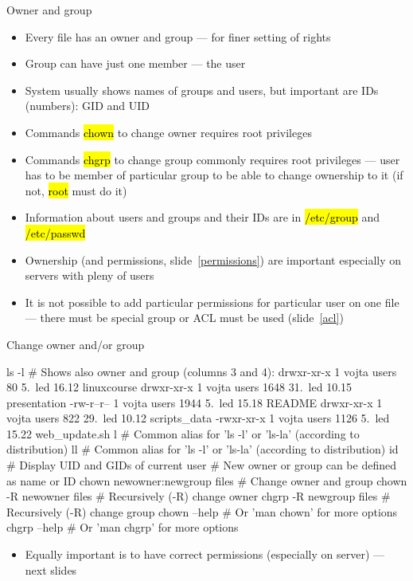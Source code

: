 \documentclass[compress, ucs, xelatex, 11pt, xcolor=svgnames,
  hyperref={
    bookmarks=true,
    unicode=true,
    colorlinks=true,
    pdftitle={Linux, command line and MetaCentrum},
    plainpages=false,
    pdfauthor={Vojtech Zeisek},
    pdfsubject={Course about use of Linux command line, writing shell scripts and using MetaCentrum of CESNET},
    pdfcreator={XeLaTeX},
    pdfkeywords={Linux, GNU, BASH, shell, command line, MetaCentrum},
    linkcolor=DarkRed,
    anchorcolor=DarkBlue,
    citecolor=Indigo,
    filecolor=NavyBlue,
    menucolor=DarkMagenta,
    urlcolor=DarkBlue,
    pdftex},
  url={hyphens, lowtilde} %
  ]{beamer}
\renewcommand{\texttt}[1]{\hl{\ttfamily #1}}
\begin{document}
\begin{frame}[fragile]{Owner and group}
  \begin{itemize}
    \item Every file has an owner and group --- for finer setting of rights
    \item Group can have just one member --- the user
    \item System usually shows names of groups and users, but important are IDs (numbers): GID and UID
    \item Commands \texttt{chown} to change owner requires root privileges
    \item Commands \texttt{chgrp} to change group commonly requires root privileges --- user has to be member of particular group to be able to change ownership to it (if not, \texttt{root} must do it)
    \item Information about users and groups and their IDs are in \texttt{/etc/group} and \texttt{/etc/passwd}
    \item Ownership (and permissions, slide~\ref{permissions}) are important especially on servers with pleny of users
    \item It is not possible to add particular permissions for particular user on one file --- there must be special group or ACL must be used (slide~\ref{acl})
  \end{itemize}
\end{frame}

\begin{frame}[fragile]{Change owner and/or group}
  \begin{bashcode}
    ls -l # Shows also owner and group (columns 3 and 4):
    drwxr-xr-x 1 vojta users    80  5. led 16.12 linuxcourse
    drwxr-xr-x 1 vojta users  1648 31. led 10.15 presentation
    -rw-r--r-- 1 vojta users  1944  5. led 15.18 README
    drwxr-xr-x 1 vojta users   822 29. led 10.12 scripts_data
    -rwxr-xr-x 1 vojta users  1126  5. led 15.22 web_update.sh
    l # Common alias for 'ls -l' or 'ls-la' (according to distribution)
    ll # Common alias for 'ls -l' or 'ls-la' (according to distribution)
    id # Display UID and GIDs of current user
    # New owner or group can be defined as name or ID
    chown newowner:newgroup files # Change owner and group
    chown -R newowner files # Recursively (-R) change owner
    chgrp -R newgroup files # Recursively (-R) change group
    chown --help # Or 'man chown' for more options
    chgrp --help # Or 'man chgrp' for more options
  \end{bashcode}
  \begin{itemize}
    \item Equally important is to have correct permissions (especially on server) --- next slides
  \end{itemize}
\end{frame}
\end{document}
